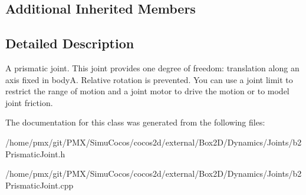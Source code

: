 \subsection*{Additional Inherited Members}


\subsection{Detailed Description}
A prismatic joint. This joint provides one degree of freedom\+: translation along an axis fixed in bodyA. Relative rotation is prevented. You can use a joint limit to restrict the range of motion and a joint motor to drive the motion or to model joint friction. 

The documentation for this class was generated from the following files\+:\begin{DoxyCompactItemize}
\item 
/home/pmx/git/\+P\+M\+X/\+Simu\+Cocos/cocos2d/external/\+Box2\+D/\+Dynamics/\+Joints/b2\+Prismatic\+Joint.\+h\item 
/home/pmx/git/\+P\+M\+X/\+Simu\+Cocos/cocos2d/external/\+Box2\+D/\+Dynamics/\+Joints/b2\+Prismatic\+Joint.\+cpp\end{DoxyCompactItemize}

